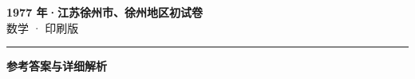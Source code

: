\documentclass[zihao=5, a4paper]{ctexart}
\begin{document}
\begin{center}
  {\Large\bfseries 1977 年·江苏徐州市、徐州地区初试卷}\\[4pt]
  {\large 数学 · 印刷版}
\end{center}
\medskip
{}

\par\bigskip\hrule\bigskip
{}
\begin{center}{\large\bfseries 参考答案与详细解析}\end{center}
\smallskip

\end{document}
